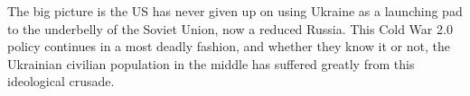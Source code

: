 The big picture is the US has never given up on using Ukraine as a launching
pad to the underbelly of the Soviet Union, now a reduced Russia. This Cold War
2.0 policy continues in a most deadly fashion, and whether they know it or not,
the Ukrainian civilian population in the middle has suffered greatly from this
ideological crusade.

\begin{multicols}{2}
\end{multicols}
